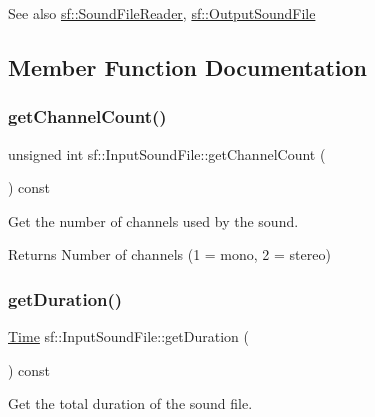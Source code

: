 \begin{DoxySeeAlso}{See also}
\hyperlink{classsf_1_1_sound_file_reader}{sf\+::\+Sound\+File\+Reader}, \hyperlink{classsf_1_1_output_sound_file}{sf\+::\+Output\+Sound\+File} 
\end{DoxySeeAlso}


\subsection{Member Function Documentation}
\mbox{\label{classsf_1_1_input_sound_file_a54307c308ba05dea63aba54a29c804a4}} 
\subsubsection{\texorpdfstring{get\+Channel\+Count()}{getChannelCount()}}
{\footnotesize\ttfamily unsigned int sf\+::\+Input\+Sound\+File\+::get\+Channel\+Count (\begin{DoxyParamCaption}{ }\end{DoxyParamCaption}) const}



Get the number of channels used by the sound. 

\begin{DoxyReturn}{Returns}
Number of channels (1 = mono, 2 = stereo) 
\end{DoxyReturn}
\mbox{\label{classsf_1_1_input_sound_file_aa081bd4d9732408d10b48227a360778e}} 
\subsubsection{\texorpdfstring{get\+Duration()}{getDuration()}}
{\footnotesize\ttfamily \hyperlink{classsf_1_1_time}{Time} sf\+::\+Input\+Sound\+File\+::get\+Duration (\begin{DoxyParamCaption}{ }\end{DoxyParamCaption}) const}



Get the total duration of the sound file. 

